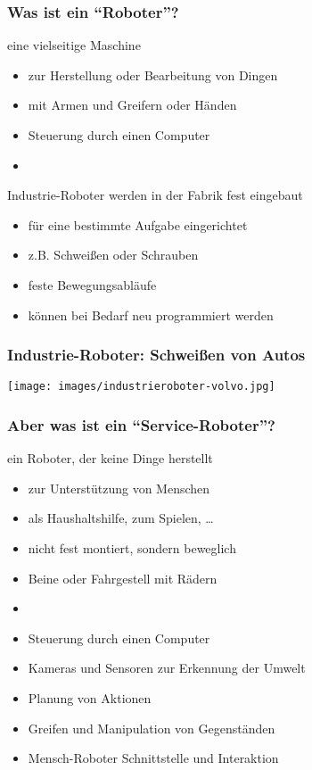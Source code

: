 \documentclass[t]{beamer}
\def\ii{\item[]}
\begin{document}
\begin{frame}
\frametitle{Was ist ein "`Roboter"'?}
eine vielseitige Maschine 
\begin{itemize}
\item zur Herstellung oder Bearbeitung von Dingen
\item mit Armen und Greifern oder Händen
\item Steuerung durch einen Computer
\ii
\end{itemize}
Industrie-Roboter werden in der Fabrik fest eingebaut
\begin{itemize}
\item für eine bestimmte Aufgabe eingerichtet
\item z.B. Schweißen oder Schrauben
\item feste Bewegungsabläufe
\item können bei Bedarf neu programmiert werden
\end{itemize}
\end{frame}


\begin{frame}
\frametitle{Industrie-Roboter: Schweißen von Autos}
\texttt{[image: images/industrieroboter-volvo.jpg]}%
\end{frame}




\begin{frame}
\frametitle{Aber was ist ein "`Service-Roboter"'?}
%
%
ein Roboter, der keine Dinge herstellt
\begin{itemize}
\item zur Unterstützung von Menschen
\item als Haushaltshilfe, zum Spielen, \dots
\item nicht fest montiert, sondern beweglich
\item Beine oder Fahrgestell mit Rädern
\item[]
\item Steuerung durch einen Computer
\item Kameras und Sensoren zur Erkennung der Umwelt
\item Planung von Aktionen
\item Greifen und Manipulation von Gegenständen
\item Mensch-Roboter Schnittstelle und Interaktion
\end{itemize}
\end{frame}
\end{document}
